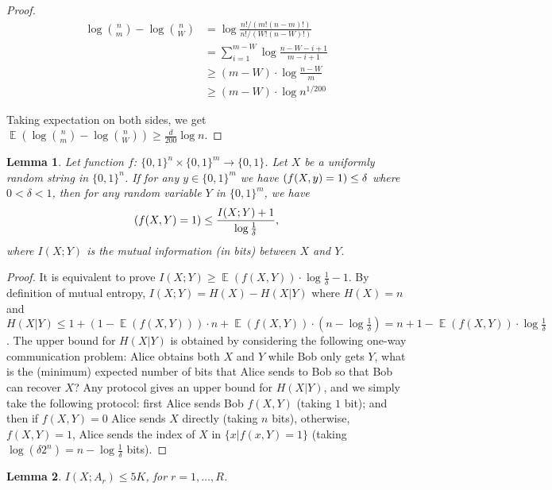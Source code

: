 \documentclass[10pt]{article}
\newtheorem{lemma}{Lemma}
\DeclareMathOperator*{\E}{\mathbb{E}}
\let\Pr\relax
\DeclareMathOperator*{\Pr}{\mathbb{P}}
\begin{document}
\begin{proof}
  \begin{align}
  \log {n \choose m}-\log {n \choose W}
  &= \log \frac{n!/(m!(n-m)!)}{n!/(W!(n-W)!)} \\
  &= \sum_{i=1}^{m-W}\log \frac{n-W-i+1}{m-i+1} \\
  &\ge (m-W)\cdot \log \frac{n-W}{m} \\
  &\ge (m-W)\cdot \log n^{1/200}
  \end{align}
  
  Taking expectation on both sides, we get $\E(\log {n \choose m}-\log {n \choose W})\ge \frac{d}{200} \log n$. 
\end{proof}

\begin{lemma}\label{lemma:mutual-entropy-vs-fail-prob}
  Let function $f$: $\{0,1\}^n\times \{0,1\}^m\rightarrow \{0,1\}$. Let $X$ be a uniformly random string in $\{0,1\}^n$. If for any $y\in \{0,1\}^m$ we have $\Pr(f(X,y)=1)\le \delta$ where $0<\delta<1$, then for any random variable $Y$ in $\{0,1\}^m$, we have 
  \begin{align}
  \Pr(f(X,Y)=1)\le \frac{I(X;Y)+1}{\log \frac{1}{\delta}},
  \end{align}
  where $I(X;Y)$ is the mutual information (in bits) between $X$ and $Y$.
\end{lemma}

\begin{proof}
  It is equivalent to prove $I(X;Y)\ge \E(f(X,Y))\cdot \log\frac{1}{\delta}-1$. By definition of mutual entropy, $I(X;Y)=H(X)-H(X|Y)$ where $H(X)=n$ and $H(X|Y)\le 1+(1-\E(f(X,Y)))\cdot n+\E(f(X,Y))\cdot (n-\log\frac{1}{\delta})=n+1-\E(f(X,Y))\cdot \log\frac{1}{\delta}$.
  The upper bound for $H(X|Y)$ is obtained by considering the following one-way communication problem: Alice obtains both $X$ and $Y$ while Bob only gets $Y$, what is the (minimum) expected number of bits that Alice sends to Bob so that Bob can recover $X$? Any protocol gives an upper bound for $H(X|Y)$, and we simply take the following protocol: first Alice sends Bob $f(X,Y)$ (taking $1$ bit); and then if $f(X,Y)=0$ Alice sends $X$ directly (taking $n$ bits), otherwise, $f(X,Y)=1$, Alice sends the index of $X$ in $\{x|f(x,Y)=1\}$ (taking $\log (\delta 2^n)=n-\log\frac{1}{\delta}$ bits).  
\end{proof}

\begin{lemma}\label{lemma:mutual-entropy-bound}
  $I(X;A_r)\le 5K$, for $r=1,\ldots, R$.
\end{lemma}
\end{document}
